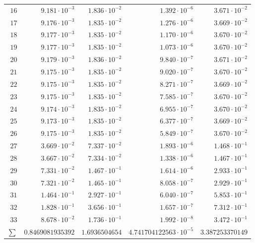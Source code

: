 {\begin{longtable}{@{}rrrrr@{}}
$16$ & $9.181\cdot10^{-3}$ & $1.836\cdot10^{-2}$ & $1.392\cdot10^{-6}$ & $3.671\cdot10^{-2}$\\
$17$ & $9.176\cdot10^{-3}$ & $1.835\cdot10^{-2}$ & $1.276\cdot10^{-6}$ & $3.669\cdot10^{-2}$\\
$18$ & $9.177\cdot10^{-3}$ & $1.835\cdot10^{-2}$ & $1.170\cdot10^{-6}$ & $3.670\cdot10^{-2}$\\
$19$ & $9.177\cdot10^{-3}$ & $1.835\cdot10^{-2}$ & $1.073\cdot10^{-6}$ & $3.670\cdot10^{-2}$\\
$20$ & $9.179\cdot10^{-3}$ & $1.836\cdot10^{-2}$ & $9.840\cdot10^{-7}$ & $3.671\cdot10^{-2}$\\
$21$ & $9.175\cdot10^{-3}$ & $1.835\cdot10^{-2}$ & $9.020\cdot10^{-7}$ & $3.670\cdot10^{-2}$\\
$22$ & $9.175\cdot10^{-3}$ & $1.835\cdot10^{-2}$ & $8.271\cdot10^{-7}$ & $3.669\cdot10^{-2}$\\
$23$ & $9.175\cdot10^{-3}$ & $1.835\cdot10^{-2}$ & $7.585\cdot10^{-7}$ & $3.670\cdot10^{-2}$\\
$24$ & $9.174\cdot10^{-3}$ & $1.835\cdot10^{-2}$ & $6.955\cdot10^{-7}$ & $3.670\cdot10^{-2}$\\
$25$ & $9.173\cdot10^{-3}$ & $1.835\cdot10^{-2}$ & $6.377\cdot10^{-7}$ & $3.669\cdot10^{-2}$\\
$26$ & $9.175\cdot10^{-3}$ & $1.835\cdot10^{-2}$ & $5.849\cdot10^{-7}$ & $3.670\cdot10^{-2}$\\
$27$ & $3.669\cdot10^{-2}$ & $7.337\cdot10^{-2}$ & $1.893\cdot10^{-6}$ & $1.468\cdot10^{-1}$\\
$28$ & $3.667\cdot10^{-2}$ & $7.334\cdot10^{-2}$ & $1.338\cdot10^{-6}$ & $1.467\cdot10^{-1}$\\
$29$ & $7.331\cdot10^{-2}$ & $1.467\cdot10^{-1}$ & $1.614\cdot10^{-6}$ & $2.933\cdot10^{-1}$\\
$30$ & $7.321\cdot10^{-2}$ & $1.465\cdot10^{-1}$ & $8.058\cdot10^{-7}$ & $2.929\cdot10^{-1}$\\
$31$ & $1.464\cdot10^{-1}$ & $2.927\cdot10^{-1}$ & $6.040\cdot10^{-7}$ & $5.853\cdot10^{-1}$\\
$32$ & $1.828\cdot10^{-1}$ & $3.656\cdot10^{-1}$ & $1.657\cdot10^{-7}$ & $7.312\cdot10^{-1}$\\
$33$ & $8.678\cdot10^{-2}$ & $1.736\cdot10^{-1}$ & $1.992\cdot10^{-8}$ & $3.472\cdot10^{-1}$\\
\midrule
$\sum$ & $0.8469081935392$ & $1.6936504654$ & $4.741704122563\cdot10^{-5}$ & $3.387253370149$\\
\end{longtable}
}

